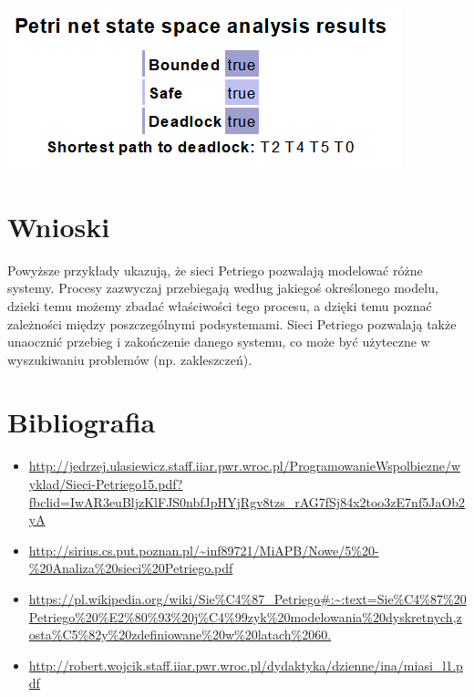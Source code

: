 \documentclass[12pt]{article}
\begin{document}
\begin{center}
\centering
    \includegraphics{zad6_state.png}
\end{center}

\section{Wnioski}
Powyższe przykłady ukazują, że sieci Petriego pozwalają modelować różne systemy. Procesy zazwyczaj przebiegają według jakiegoś określonego modelu, dzieki temu możemy zbadać właściwości tego procesu, a dzięki temu poznać zależności między poszczególnymi podsystemami. Sieci Petriego pozwalają także unaocznić przebieg i zakończenie danego systemu, co może być użyteczne w wyszukiwaniu problemów (np. zakleszczeń). 

\section{Bibliografia}
\begin{itemize}
    \item \url{http://jedrzej.ulasiewicz.staff.iiar.pwr.wroc.pl/ProgramowanieWspolbiezne/wyklad/Sieci-Petriego15.pdf?fbclid=IwAR3euBljzKlFJS0nbfJpHYjRgv8tzs_rAG7fSj84x2too3zE7nf5JaOb2yA}
    \item \url{http://sirius.cs.put.poznan.pl/~inf89721/MiAPB/Nowe/5%20-%20Analiza%20sieci%20Petriego.pdf}
    \item \url{https://pl.wikipedia.org/wiki/Sie%C4%87_Petriego#:~:text=Sie%C4%87%20Petriego%20%E2%80%93%20j%C4%99zyk%20modelowania%20dyskretnych,zosta%C5%82y%20zdefiniowane%20w%20latach%2060.}
    \item \url{http://robert.wojcik.staff.iiar.pwr.wroc.pl/dydaktyka/dzienne/ina/miasi_l1.pdf}
\end{itemize}
\end{document}

